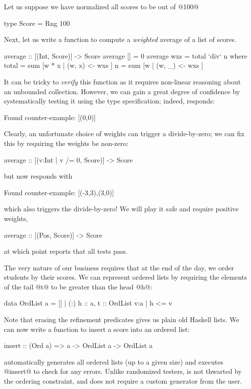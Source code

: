 Let us suppose we have normalized all scores to be out of @100@
%
\begin{code}
  type Score = Rng 100
\end{code}
%
Next, let us write a function to compute a \emph{weighted} average 
of a list of scores.
%
\begin{code}
  average     :: [(Int, Score)] -> Score
  average []  = 0
  average wxs = total `div` n
    where
      total   = sum [w * x | (w, x) <- wxs ]
      n       = sum [w     | (w, _) <- wxs ]
\end{code}
%
It can be tricky to \emph{verify} this function as it requires non-linear reasoning
about an unbounded collection. However, we can gain a great degree of confidence by
systematically testing it using the type specification; indeed, \toolname responds:
%
\begin{code}
  Found counter-example: [(0,0)]
\end{code}
%
Clearly, an unfortunate choice of weights can trigger a divide-by-zero; we can fix 
this by requiring the weights be non-zero:
%
\begin{code}
  average :: [({v:Int | v /= 0}, Score)] -> Score
\end{code}
%
but now \toolname responds with
%
\begin{code}
  Found counter-example: [(-3,3),(3,0)]
\end{code}
% 
which also triggers the divide-by-zero! We will play it safe and require positive weights,
%
\begin{code}
  average :: [(Pos, Score)] -> Score
\end{code}
%
at which point \toolname reports that all tests pass.

The very nature of our business requires that at the end of the day,
we order students by their scores. We can represent ordered lists by 
requiring the elements of the tail @t@ to be greater than the head @h@:
%
\begin{code}
data OrdList a = [] | (:) {h :: a, t :: OrdList {v:a | h <= v}}
\end{code}
%
Note that erasing the refinement predicates gives us plain old Haskell lists.
We can now write a function to insert a score into an ordered list:
%
\begin{code}
  insert :: (Ord a) => a -> OrdList a -> OrdList a 
\end{code}
%
\toolname automatically generates all ordered lists (up to a given size)
and executes @insert@ to check for any errors. Unlike randomized testers, 
\toolname is not thwarted by the ordering constraint, and does not require a
custom generator from the user.

